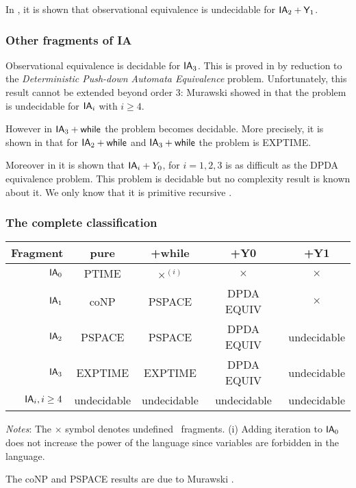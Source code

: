 In \cite{Ong02}, it is shown that observational equivalence is
undecidable for $\textsf{IA}_2 + \textsf{Y}_1$.


\subsubsection{Other fragments of IA}

Observational equivalence is decidable for $\textsf{IA}_3$. This is
proved in \cite{Ong02} by reduction to the \emph{Deterministic
Push-down Automata Equivalence} problem. Unfortunately, this result
cannot be extended beyond order $3$: Murawski showed in
\cite{murawski03program} that the problem is undecidable for
$\textsf{IA}_i$ with $i\geq4$.

However in $\textsf{IA}_3 + \textsf{while}$ the problem becomes
decidable. More precisely, it is shown in \cite{C:MW05} that
for $\textsf{IA}_2 + \textsf{while}$ and $\textsf{IA}_3 + \textsf{while}$ the problem is EXPTIME.

Moreover in \cite{C:MOW05} it is shown that $\textsf{IA}_i +Y_0$, for $i
= 1, 2, 3$ is as difficult as the DPDA equivalence problem. This
problem is decidable \citep{DBLP:journals/tcs/Senizergues01} but no
complexity result is known about it. We only know that it is
primitive recursive \citep{stirling02}.

\subsubsection{The complete classification}
\begin{center}
\begin{tabular}{rcccc}
Fragment  & pure & +while & +Y0 & +Y1 \\ \hline \hline
$\textsf{IA}_0$ & PTIME & $\times^{(i)}$ & $\times$ & $\times$  \\
$\textsf{IA}_1$ & coNP & PSPACE & DPDA EQUIV & $\times$ \\
$\textsf{IA}_2$ & PSPACE & PSPACE & DPDA EQUIV & undecidable \\
$\textsf{IA}_3$ &EXPTIME & EXPTIME & DPDA EQUIV & undecidable \\
$\textsf{IA}_i, i \geq 4$  & undecidable & undecidable & undecidable
& undecidable
\end{tabular}
\vspace{12pt}

\emph{Notes}: The $\times$ symbol denotes undefined \ialgol\ fragments.
(i) Adding iteration to $\textsf{IA}_0$ does not increase the power of the language since variables are forbidden in the language.
\end{center}

The coNP and PSPACE results are due to Murawski \citep{Mur04b}.

%
